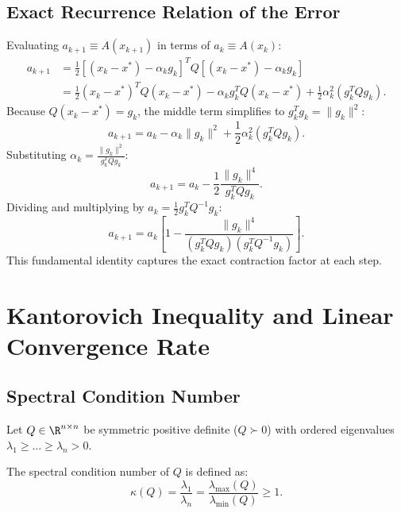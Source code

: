 \subsection{Exact Recurrence Relation of the Error}
Evaluating $a_{k+1} \equiv A(x_{k+1})$ in terms of $a_k \equiv A(x_k)$:
\begin{align}
    a_{k+1} &= \frac{1}{2} [(x_k - x^*) - \alpha_k g_k]^T Q [(x_k - x^*) - \alpha_k g_k] \nonumber \\
            &= \frac{1}{2} (x_k - x^*)^T Q (x_k - x^*) - \alpha_k g_k^T Q (x_k - x^*) + \frac{1}{2} \alpha_k^2 (g_k^T Q g_k).
\end{align}
Because $Q(x_k - x^*) = g_k$, the middle term simplifies to $g_k^T g_k = \|g_k\|^2$:
\begin{equation}
    a_{k+1} = a_k - \alpha_k \|g_k\|^2 + \frac{1}{2} \alpha_k^2 (g_k^T Q g_k).
\end{equation}
Substituting $\alpha_k = \frac{\|g_k\|^2}{g_k^T Q g_k}$:
\begin{equation}
    a_{k+1} = a_k - \frac{1}{2} \frac{\|g_k\|^4}{g_k^T Q g_k}.
\end{equation}
Dividing and multiplying by $a_k = \frac{1}{2} g_k^T Q^{-1} g_k$:
\begin{equation}
    a_{k+1} = a_k \left[ 1 - \frac{\|g_k\|^4}{(g_k^T Q g_k)(g_k^T Q^{-1} g_k)} \right].
    \label{eq:error-exact-recurrence-en}
\end{equation}
This fundamental identity captures the exact contraction factor at each step.

\FloatBarrier
\section{Kantorovich Inequality and Linear Convergence Rate}
\label{sec:kantorovich-linear-convergence}

\subsection{Spectral Condition Number}
Let $Q \in \R^{n \times n}$ be symmetric positive definite ($Q \succ 0$) with ordered eigenvalues $\lambda_1 \ge \dots \ge \lambda_n > 0$.

\begin{definition}
The spectral condition number of $Q$ is defined as:
\begin{equation}
    \kappa(Q) = \frac{\lambda_1}{\lambda_n} = \frac{\lambda_{\max}(Q)}{\lambda_{\min}(Q)} \ge 1.
\end{equation}
\end{definition}

